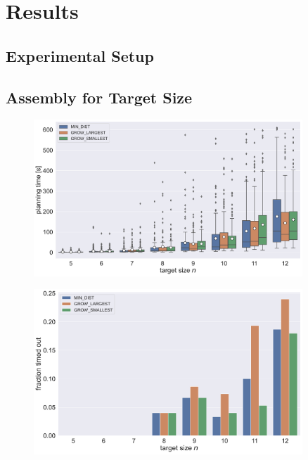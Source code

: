 \chapter{Results}
\label{chap:results}


\section{Experimental Setup}



\section{Assembly for Target Size}

\begin{figure}
	\centering
	\includegraphics[width=0.9\textwidth]{figures/plots/AFN_time.pdf}
	\caption[]{}
	\label{fig:AFN_time}
\end{figure}

\begin{figure}
	\centering
	\includegraphics[width=0.9\textwidth]{figures/plots/AFN_timeout.pdf}
	\caption[]{}
	\label{fig:AFN_timeout}
\end{figure}

